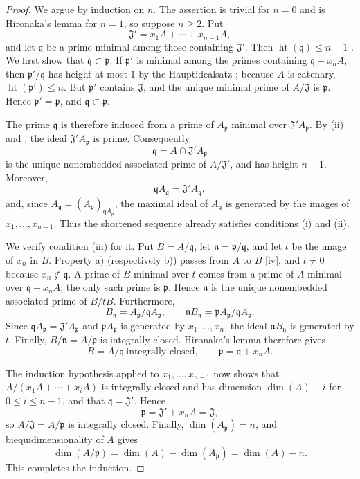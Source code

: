 \begin{proof}
We argue by induction on $n$.  The assertion is trivial for
$n=0$ and is Hironaka's lemma for $n=1$, so suppose $n\geq2$.
Put
\[
  \mathfrak J'=x_1A+\cdots+x_{n-1}A,
\]
and let $\mathfrak q$ be a prime minimal among those containing
$\mathfrak J'$.  Then
$\operatorname{ht}(\mathfrak q)\leq n-1$
.  We first show that
$\mathfrak q\subset\mathfrak p$.  If $\mathfrak p'$ is minimal
among the primes containing $\mathfrak q+x_nA$, then
$\mathfrak p'/\mathfrak q$ has height at most $1$ by the
Hauptidealsatz ; because $A$ is catenary,
$\operatorname{ht}(\mathfrak p')\leq n$.  But $\mathfrak p'$
contains $\mathfrak J$, and the unique minimal prime of
$A/\mathfrak J$ is $\mathfrak p$.  Hence
$\mathfrak p'=\mathfrak p$, and $\mathfrak q\subset\mathfrak p$.


The prime $\mathfrak q$ is therefore induced from a prime of
$A_{\mathfrak p}$ minimal over
$\mathfrak J'A_{\mathfrak p}$.  By {\rm(ii)} and
, the ideal
$\mathfrak J'A_{\mathfrak p}$ is prime.  Consequently
\[
  \mathfrak q=A\cap\mathfrak J'A_{\mathfrak p}
\]
is the unique nonembedded associated prime of
$A/\mathfrak J'$, and has height $n-1$.  Moreover,
\[
  \mathfrak qA_{\mathfrak q}
  =\mathfrak J'A_{\mathfrak q},
\]
and, since
$A_{\mathfrak q}=(A_{\mathfrak p})_{\mathfrak qA_{\mathfrak p}}$,
the maximal ideal of $A_{\mathfrak q}$ is generated by the
images of $x_1,\ldots,x_{n-1}$.  Thus the shortened sequence
already satisfies conditions {\rm(i)} and {\rm(ii)}.

We verify condition {\rm(iii)} for it.  Put
$B=A/\mathfrak q$, let $\mathfrak n=\mathfrak p/\mathfrak q$,
and let $t$ be the image of $x_n$ in $B$.  Property {\rm a)}
(respectively {\rm b)}) passes from $A$ to $B$
[iv], and $t\ne0$ because
$x_n\notin\mathfrak q$.  A prime of $B$ minimal over $t$ comes
from a prime of $A$ minimal over $\mathfrak q+x_nA$; the only
such prime is $\mathfrak p$.  Hence $\mathfrak n$ is the unique
nonembedded associated prime of $B/tB$.  Furthermore,
\[
  B_{\mathfrak n}
    =A_{\mathfrak p}/\mathfrak qA_{\mathfrak p},
  \qquad
  \mathfrak nB_{\mathfrak n}
    =\mathfrak pA_{\mathfrak p}/\mathfrak qA_{\mathfrak p}.
\]
Since
$\mathfrak qA_{\mathfrak p}=\mathfrak J'A_{\mathfrak p}$
and $\mathfrak pA_{\mathfrak p}$ is generated by
$x_1,\ldots,x_n$, the ideal
$\mathfrak nB_{\mathfrak n}$ is generated by $t$.  Finally,
$B/\mathfrak n=A/\mathfrak p$ is integrally closed.  Hironaka's
lemma therefore gives
\[
  B=A/\mathfrak q\ \text{integrally closed},
  \qquad
  \mathfrak p=\mathfrak q+x_nA.
\]

The induction hypothesis applied to
$x_1,\ldots,x_{n-1}$ now shows that
$A/(x_1A+\cdots+x_iA)$ is integrally closed and has dimension
$\dim(A)-i$ for $0\leq i\leq n-1$, and that
$\mathfrak q=\mathfrak J'$.  Hence
\[
  \mathfrak p=\mathfrak J'+x_nA=\mathfrak J,
\]
so $A/\mathfrak J=A/\mathfrak p$ is integrally closed.  Finally,
$\dim(A_{\mathfrak p})=n$, and biequidimensionality of $A$
gives
\[
  \dim(A/\mathfrak p)
  =\dim(A)-\dim(A_{\mathfrak p})
  =\dim(A)-n.
\]
This completes the induction.
\end{proof}
